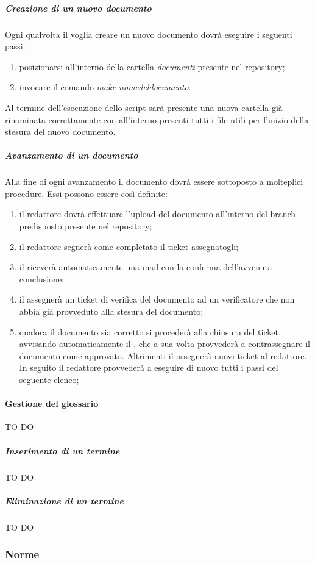 				\subparagraph{Creazione di un nuovo documento}
				Ogni qualvolta il \roleProjectManager voglia creare un nuovo documento dovrà eseguire i seguenti passi:
				\begin{enumerate}
					\item posizionarsi all'interno della cartella \emph{documenti} presente nel repository;
					\item invocare il comando \emph{make nome\textunderscore del\textunderscore documento}.
				\end{enumerate}
				Al termine dell'esecuzione dello script sarà presente una nuova cartella già rinominata correttamente con all'interno presenti tutti i file utili per l'inizio della stesura del nuovo documento.

				\subparagraph{Avanzamento di un documento}
				Alla fine di ogni avanzamento il documento dovrà essere sottoposto a molteplici procedure. Essi possono essere così definite:
				\begin{enumerate}
					\item il redattore dovrà effettuare l'upload del documento all'interno del branch predisposto presente nel repository;
					\item il redattore segnerà come completato il ticket assegnatogli;
					\item il \roleProjectManager{} riceverà automaticamente una mail con la conferma dell'avvenuta conclusione;
					\item il \roleProjectManager{} assegnerà un ticket di verifica del documento ad un verificatore che non abbia già provveduto alla stesura del documento;
					\item qualora il documento sia corretto si procederà alla chiusura del ticket, avvisando automaticamente il \roleProjectManager{}, che a sua volta provvederà a contrassegnare il documento come approvato. Altrimenti il \roleVerifier{} assegnerà nuovi ticket al redattore. In seguito il redattore provvederà a eseguire di nuovo tutti i passi del seguente elenco;
				\end{enumerate}

			\paragraph{Gestione del glossario} TO DO
				\subparagraph{Inserimento di un termine} TO DO
				\subparagraph{Eliminazione di un termine} TO DO

		\subsubsection{Norme}

